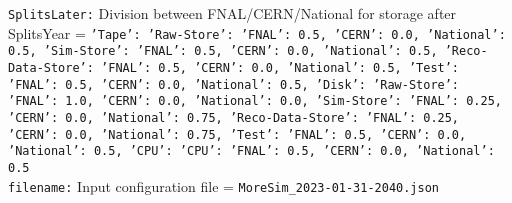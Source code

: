 {\tt SplitsLater:} Division between FNAL/CERN/National for storage after SplitsYear = {\tt {'Tape': {'Raw-Store': {'FNAL': 0.5, 'CERN': 0.0, 'National': 0.5}, 'Sim-Store': {'FNAL': 0.5, 'CERN': 0.0, 'National': 0.5}, 'Reco-Data-Store': {'FNAL': 0.5, 'CERN': 0.0, 'National': 0.5}, 'Test': {'FNAL': 0.5, 'CERN': 0.0, 'National': 0.5}}, 'Disk': {'Raw-Store': {'FNAL': 1.0, 'CERN': 0.0, 'National': 0.0}, 'Sim-Store': {'FNAL': 0.25, 'CERN': 0.0, 'National': 0.75}, 'Reco-Data-Store': {'FNAL': 0.25, 'CERN': 0.0, 'National': 0.75}, 'Test': {'FNAL': 0.5, 'CERN': 0.0, 'National': 0.5}}, 'CPU': {'CPU': {'FNAL': 0.5, 'CERN': 0.0, 'National': 0.5}}}} \\
{\tt filename:} Input configuration file = {\tt MoreSim\_2023-01-31-2040.json} \\

